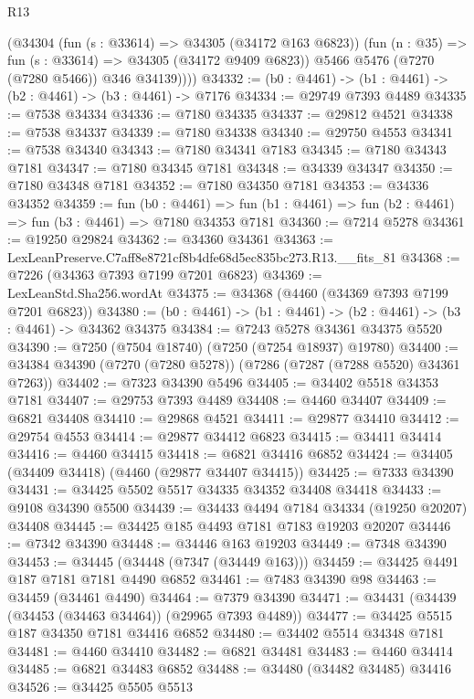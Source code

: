 \begin{lexlean}{R13}
\begin{coremodule}
          (@34304
            (fun (s : @33614) => @34305 (@34172 @163 @6823))
            (fun (n : @35) => fun (s : @33614) => @34305 (@34172 @9409 @6823))
            @5466
            @5476
            (@7270 (@7280 @5466))
            @346
            @34139))))
@34332 := (b0 : @4461) -> (b1 : @4461) -> (b2 : @4461) -> (b3 : @4461) -> @7176
@34334 := @29749 @7393 @4489
@34335 := @7538 @34334
@34336 := @7180 @34335
@34337 := @29812 @4521
@34338 := @7538 @34337
@34339 := @7180 @34338
@34340 := @29750 @4553
@34341 := @7538 @34340
@34343 := @7180 @34341 @7183
@34345 := @7180 @34343 @7181
@34347 := @7180 @34345 @7181
@34348 := @34339 @34347
@34350 := @7180 @34348 @7181
@34352 := @7180 @34350 @7181
@34353 := @34336 @34352
@34359 := fun (b0 : @4461) =>
  fun (b1 : @4461) => fun (b2 : @4461) => fun (b3 : @4461) => @7180 @34353 @7181
@34360 := @7214 @5278
@34361 := @19250 @29824
@34362 := @34360 @34361
@34363 := LexLeanPreserve.C7aff8e8721cf8b4dfe68d5ec835bc273.R13.__fits_81
@34368 := @7226 (@34363 @7393 @7199 @7201 @6823)
@34369 := LexLeanStd.Sha256.wordAt
@34375 := @34368 (@4460 (@34369 @7393 @7199 @7201 @6823))
@34380 := (b0 : @4461) -> (b1 : @4461) -> (b2 : @4461) -> (b3 : @4461) -> @34362 @34375
@34384 := @7243 @5278 @34361 @34375 @5520
@34390 := @7250 (@7504 @18740) (@7250 (@7254 @18937) @19780)
@34400 := @34384 @34390 (@7270 (@7280 @5278)) (@7286 (@7287 (@7288 @5520) @34361 @7263))
@34402 := @7323 @34390 @5496
@34405 := @34402 @5518 @34353 @7181
@34407 := @29753 @7393 @4489
@34408 := @4460 @34407
@34409 := @6821 @34408
@34410 := @29868 @4521
@34411 := @29877 @34410
@34412 := @29754 @4553
@34414 := @29877 @34412 @6823
@34415 := @34411 @34414
@34416 := @4460 @34415
@34418 := @6821 @34416 @6852
@34424 := @34405 (@34409 @34418) (@4460 (@29877 @34407 @34415))
@34425 := @7333 @34390
@34431 := @34425 @5502 @5517 @34335 @34352 @34408 @34418
@34433 := @9108 @34390 @5500
@34439 := @34433 @4494 @7184 @34334 (@19250 @20207) @34408
@34445 := @34425 @185 @4493 @7181 @7183 @19203 @20207
@34446 := @7342 @34390
@34448 := @34446 @163 @19203
@34449 := @7348 @34390
@34453 := @34445 (@34448 (@7347 (@34449 @163)))
@34459 := @34425 @4491 @187 @7181 @7181 @4490 @6852
@34461 := @7483 @34390 @98
@34463 := @34459 (@34461 @4490)
@34464 := @7379 @34390
@34471 := @34431 (@34439 (@34453 (@34463 @34464)) (@29965 @7393 @4489))
@34477 := @34425 @5515 @187 @34350 @7181 @34416 @6852
@34480 := @34402 @5514 @34348 @7181
@34481 := @4460 @34410
@34482 := @6821 @34481
@34483 := @4460 @34414
@34485 := @6821 @34483 @6852
@34488 := @34480 (@34482 @34485) @34416
@34526 := @34425
    @5505
    @5513

\end{coremodule}
\end{lexlean}
